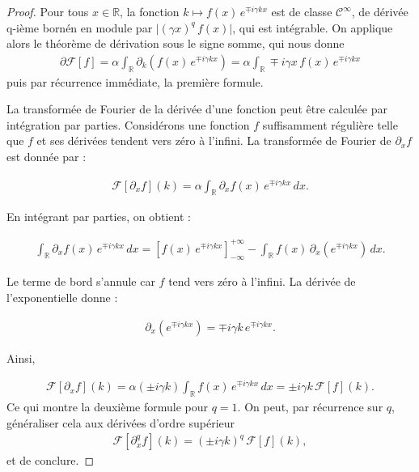 \begin{proof}
    Pour tous $x \in \mathbb R$, la fonction $k \mapsto f(x) \, e^{\mp i \gamma k x } $ est de classe $ \mathcal C^\infty $, de dérivée q-ième bornén en module par $\vert (\gamma x )^q \, f(x) \vert $, qui est intégrable. On applique alors le théorème de dérivation sous le signe somme, qui nous donne 
    \begin{eqnarray}
        \partial \mathcal F[f] = \alpha \int_{\mathbb R} \partial_k (f(x)\, e^{\mp i \gamma k x }) = \alpha \int_{\mathbb R} \mp i \gamma  x \, f(x)\, e^{\mp i \gamma k x }
    \end{eqnarray}
    puis par récurrence immédiate, la première formule.

    \smallskip

    La transformée de Fourier de la dérivée d'une fonction peut être calculée par intégration par parties. Considérons une fonction $f$ suffisamment régulière telle que $f$ et ses dérivées tendent vers zéro à l'infini. La transformée de Fourier de $\partial_x f$ est donnée par :

    \begin{eqnarray}
        \mathcal{F}[\partial_x f](k) = \alpha \int_{\mathbb{R}} \partial_x f(x) \, e^{\mp i \gamma k x} \, dx.
    \end{eqnarray}

    En intégrant par parties, on obtient :

    \begin{eqnarray}
        \int_{\mathbb{R}} \partial_x f(x) \, e^{\mp i \gamma k x} \, dx = \left[ f(x) \, e^{\mp i \gamma k x} \right]_{-\infty}^{+\infty} - \int_{\mathbb{R}} f(x) \, \partial_x \left( e^{\mp i \gamma k x} \right) \, dx.
    \end{eqnarray}

    Le terme de bord s'annule car $f$ tend vers zéro à l'infini. La dérivée de l'exponentielle donne :

    \begin{eqnarray}
        \partial_x \left( e^{\mp i \gamma k x} \right) = \mp i \gamma k \, e^{\mp i \gamma k x}.
    \end{eqnarray}

    Ainsi,

    \begin{eqnarray}
            \mathcal{F}[\partial_x f](k) = \alpha \left( \pm i \gamma k \right) \int_{\mathbb{R}} f(x) \, e^{\mp i \gamma k x} \, dx = \pm i \gamma k \, \mathcal{F}[f](k).
    \end{eqnarray}
    Ce qui montre la deuxième formule pour $q=1$. On peut, par récurrence sur $q$, généraliser cela aux dérivées d'ordre supérieur 
    \begin{eqnarray}
        \mathcal{F}[\partial_x^q f](k) = (\pm i \gamma k)^q \, \mathcal{F}[f](k),
    \end{eqnarray}
    et de conclure.

\end{proof}

